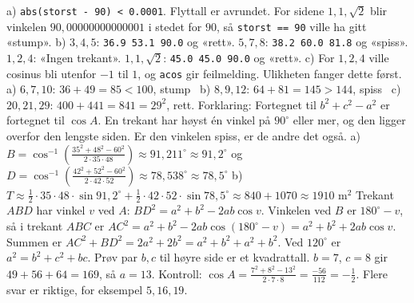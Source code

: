  a) \lstinline[style=laereverk,numbers=none,frame=none]|abs(storst - 90) < 0.0001|. Flyttall er avrundet. For sidene $1, 1, \sqrt2$ blir vinkelen $90{,}00000000000001$ i stedet for $90$, så \lstinline[style=laereverk,numbers=none,frame=none]|storst == 90| ville ha gitt «stump».
b) $3,4,5$: \texttt{36.9 53.1 90.0} og «rett». $5,7,8$: \texttt{38.2 60.0 81.8} og «spiss». $1,2,4$: «Ingen trekant». $1,1,\sqrt2$: \texttt{45.0 45.0 90.0} og «rett».
c) For $1,2,4$ ville cosinus bli utenfor $-1$ til $1$, og \lstinline[style=laereverk,numbers=none,frame=none]|acos| gir feilmelding. Ulikheten fanger dette først.
 a) $6,7,10$: $36 + 49 = 85 < 100$, stump \ b) $8,9,12$: $64 + 81 = 145 > 144$, spiss \ c) $20,21,29$: $400 + 441 = 841 = 29^2$, rett.
Forklaring: Fortegnet til $b^2 + c^2 - a^2$ er fortegnet til $\cos A$. En trekant har høyst én vinkel på $90^\circ$ eller mer, og den ligger overfor den lengste siden. Er den vinkelen spiss, er de andre det også.
 a) $B = \cos^{-1}\!\left(\frac{35^2 + 48^2 - 60^2}{2\cdot35\cdot48}\right) \approx 91{,}211^\circ \approx 91{,}2^\circ$ og $D = \cos^{-1}\!\left(\frac{42^2 + 52^2 - 60^2}{2\cdot42\cdot52}\right) \approx 78{,}538^\circ \approx 78{,}5^\circ$
b) $T \approx \frac12\cdot35\cdot48\cdot\sin 91{,}2^\circ + \frac12\cdot42\cdot52\cdot\sin 78{,}5^\circ \approx 840 + 1070 \approx 1910$ m$^2$
 Trekant $ABD$ har vinkel $v$ ved $A$: $BD^2 = a^2 + b^2 - 2ab\cos v$. Vinkelen ved $B$ er $180^\circ - v$, så i trekant $ABC$ er $AC^2 = a^2 + b^2 - 2ab\cos(180^\circ - v) = a^2 + b^2 + 2ab\cos v$. Summen er $AC^2 + BD^2 = 2a^2 + 2b^2 = a^2 + b^2 + a^2 + b^2$.
 Ved $120^\circ$ er $a^2 = b^2 + c^2 + bc$. Prøv par $b, c$ til høyre side er et kvadrattall. $b = 7$, $c = 8$ gir $49 + 56 + 64 = 169$, så $a = 13$. Kontroll: $\cos A = \frac{7^2 + 8^2 - 13^2}{2\cdot7\cdot8} = \frac{-56}{112} = -\frac12$. Flere svar er riktige, for eksempel $5, 16, 19$.
